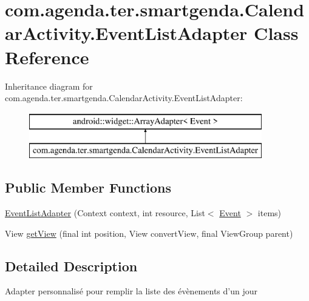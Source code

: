 \hypertarget{classcom_1_1agenda_1_1ter_1_1smartgenda_1_1_calendar_activity_1_1_event_list_adapter}{\section{com.\-agenda.\-ter.\-smartgenda.\-Calendar\-Activity.\-Event\-List\-Adapter Class Reference}
\label{classcom_1_1agenda_1_1ter_1_1smartgenda_1_1_calendar_activity_1_1_event_list_adapter}
}
Inheritance diagram for com.\-agenda.\-ter.\-smartgenda.\-Calendar\-Activity.\-Event\-List\-Adapter\-:\begin{figure}[H]
\begin{center}
\leavevmode
\includegraphics[height=2.000000cm]{classcom_1_1agenda_1_1ter_1_1smartgenda_1_1_calendar_activity_1_1_event_list_adapter}
\end{center}
\end{figure}
\subsection*{Public Member Functions}
\begin{DoxyCompactItemize}
\item 
\hyperlink{classcom_1_1agenda_1_1ter_1_1smartgenda_1_1_calendar_activity_1_1_event_list_adapter_a178ca89d13169bad24e21fe0c57569df}{Event\-List\-Adapter} (Context context, int resource, List$<$ \hyperlink{classcom_1_1agenda_1_1ter_1_1model_1_1_event}{Event} $>$ items)
\item 
View \hyperlink{classcom_1_1agenda_1_1ter_1_1smartgenda_1_1_calendar_activity_1_1_event_list_adapter_a0c1857b695bbae5085acc8f8f5d68595}{get\-View} (final int position, View convert\-View, final View\-Group parent)
\end{DoxyCompactItemize}


\subsection{Detailed Description}
Adapter personnalisé pour remplir la liste des évènements d'un jour 

